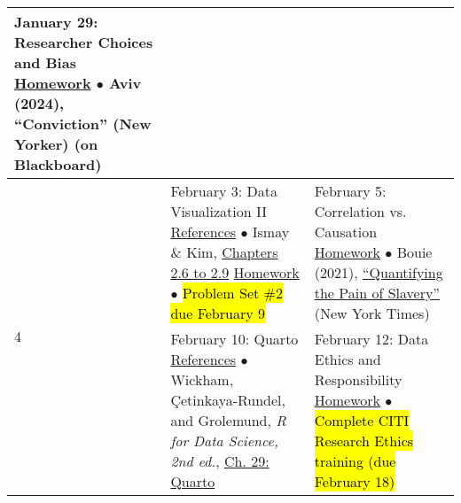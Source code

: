 \documentclass[12pt,letterpaper]{article}
\begin{document}
\begin{tabularx}{\textwidth}{|p{}|p{}||p{}|}
January 29: Researcher Choices and Bias \newline \newline
\ul{Homework} \newline
$\bullet$ Aviv (2024), ``Conviction'' (New Yorker) (on Blackboard) \\


\hline
\multirow{7}{*}{4} &

February 3: Data Visualization II \newline \newline
\ul{References} \newline
$\bullet$ Ismay \& Kim, \href{https://moderndive.com/2-viz.html}{Chapters 2.6 to 2.9} \newline \newline
\ul{Homework} \newline
$\bullet$ \hl{Problem Set \#2 due February 9} &

February 5: Correlation vs. Causation \newline \newline
\ul{Homework} \newline
$\bullet$ Bouie (2021), \href{https://www.nytimes.com/2022/01/28/opinion/slavery-voyages-data-sets.html?unlocked_article_code=AAAAAAAAAAAAAAAACEIPuomT1JKd6J17Vw1cRCfTTMQmqxCdw_PIxftm3iWka3DMDmwSiOMNAo6B_EGKfq5qedYpznGFQ85IP7I0AfB70uYaJEFxUE-ovp6A0twjEhkClLiSDCkwzo6fGvcx6yPrZW20b7wunbDk5hmPdWXsUfbA1SZwLBI2pJRlaVz62nUClvzHErUm08Jsnqt0XuAMTjkKYCWOt_foGk8-bI3ANkeAn1FwD-JJWjjTnsqe66YBcWhRD1HGRHB95gUs-Y8WeYNXbOukcUlWKIepiq4RC2doMI6oG5QyIoDRnL5hurfJwgeeak8qYELPltMIK9ta2EiT_g\&smid=url-share}{``Quantifying the Pain of Slavery''} (New York Times) \\


\hline
\multirow{6}{*}{5} &

February 10: Quarto \newline \newline
\ul{References} \newline
$\bullet$ Wickham, Çetinkaya-Rundel, and Grolemund, \emph{R for Data Science, 2nd ed.}, \href{https://r4ds.hadley.nz/quarto}{Ch. 29: Quarto}  &

February 12: Data Ethics and Responsibility \newline \newline
\ul{Homework} \newline
$\bullet$ \hl{Complete CITI Research Ethics training (due February 18)} \\


\end{tabularx}
\end{document}

